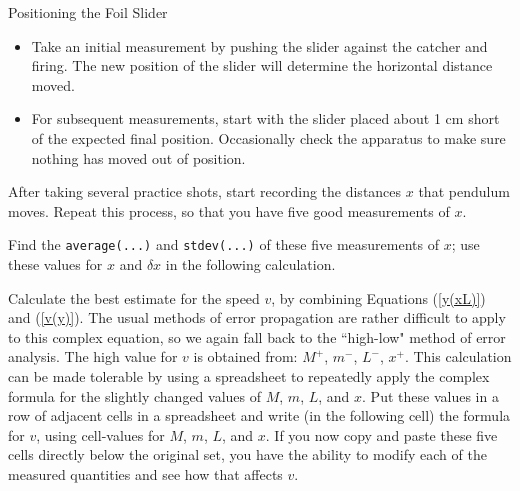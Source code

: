 \item Positioning the Foil Slider

	\begin{itemize}

	\item Take an initial measurement by pushing the slider
         against the catcher and firing.  The new position of the
         slider will determine the horizontal distance moved.

	\item  For subsequent measurements, start with the slider
        placed about 1 cm short of the expected final position.
        Occasionally check the apparatus to make sure nothing has
        moved out of position.
	
	\end{itemize}

\item After taking several practice shots,
start recording the distances $x$ that pendulum moves.
Repeat this process, so that you have  five good 
measurements of $x$.  


\item Find  the {\tt average(...)} and  {\tt stdev(...)} of these five
measurements of $x$; use these values for $x$ and $\delta x$ in the following
calculation.

\item Calculate the best estimate for the speed $v$, by combining Equations (\ref{y(xL)}) and (\ref{v(y)}).
The usual methods of error propagation are rather difficult to apply to this
complex equation, so we again fall back to the ``high-low" method of error analysis.
The high value for $v$ is obtained from: $M^+$, $m^-$, $L^-$, $x^+$.
This calculation can be made tolerable by using   a spreadsheet  to repeatedly
apply the complex formula for the slightly changed values of
$M$, $m$, $L$, and $x$.  Put these values
in a row of adjacent  cells in a spreadsheet
and write (in the following cell) the formula for $v$, using 
cell-values for $M$, $m$, $L$, and $x$.
If you now copy and paste these five cells directly below
the original set, you have the ability to modify each of the measured
quantities and see how that affects $v$.  %

